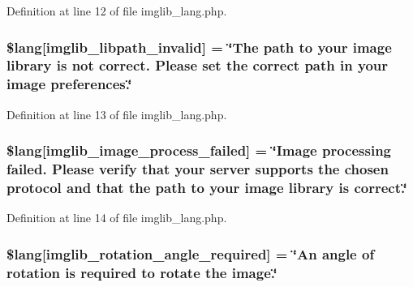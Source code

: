 Definition at line 12 of file imglib\+\_\+lang.\+php.

\subsubsection[{\texorpdfstring{\$lang}{$lang}}]{\setlength{\rightskip}{0pt plus 5cm}\$lang\mbox{[}\textquotesingle{}imglib\+\_\+libpath\+\_\+invalid\textquotesingle{}\mbox{]} = \char`\"{}The path to your image library is not correct. Please set the correct path in your image preferences.\char`\"{}}\hypertarget{application_2language_2russian_2imglib__lang_8php_a8f190c17a02ca89334c8bf0a04333f65}{}\label{application_2language_2russian_2imglib__lang_8php_a8f190c17a02ca89334c8bf0a04333f65}


Definition at line 13 of file imglib\+\_\+lang.\+php.

\subsubsection[{\texorpdfstring{\$lang}{$lang}}]{\setlength{\rightskip}{0pt plus 5cm}\$lang\mbox{[}\textquotesingle{}imglib\+\_\+image\+\_\+process\+\_\+failed\textquotesingle{}\mbox{]} = \char`\"{}Image processing failed. Please verify that your server supports the chosen protocol and that the path to your image library is correct.\char`\"{}}\hypertarget{application_2language_2russian_2imglib__lang_8php_a9ac6659eb97dd12e5c714cc9635cf22e}{}\label{application_2language_2russian_2imglib__lang_8php_a9ac6659eb97dd12e5c714cc9635cf22e}


Definition at line 14 of file imglib\+\_\+lang.\+php.

\subsubsection[{\texorpdfstring{\$lang}{$lang}}]{\setlength{\rightskip}{0pt plus 5cm}\$lang\mbox{[}\textquotesingle{}imglib\+\_\+rotation\+\_\+angle\+\_\+required\textquotesingle{}\mbox{]} = \char`\"{}An angle of rotation is required to rotate the image.\char`\"{}}\hypertarget{application_2language_2russian_2imglib__lang_8php_a1110d59ea8fd0564e78068dbda3438fb}{}\label{application_2language_2russian_2imglib__lang_8php_a1110d59ea8fd0564e78068dbda3438fb}


